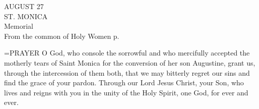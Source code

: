 \begin{center}\normalsize AUGUST 27\\
\footnotesize ST. MONICA\\
\footnotesize Memorial\\
\footnotesize From the common of Holy Women p. \\
\end{center}

\hangindent=\parindent \small{PRAYER 
O God, who console the sorrowful
and who mercifully accepted
the motherly tears of Saint Monica
for the conversion of her son Augustine,
grant us, through the intercession of them both,
that we may bitterly regret our sins
and find the grace of your pardon.
Through our Lord Jesus Christ, your Son,
who lives and reigns with you in the unity of the Holy Spirit,
one God, for ever and ever.\\}
 
